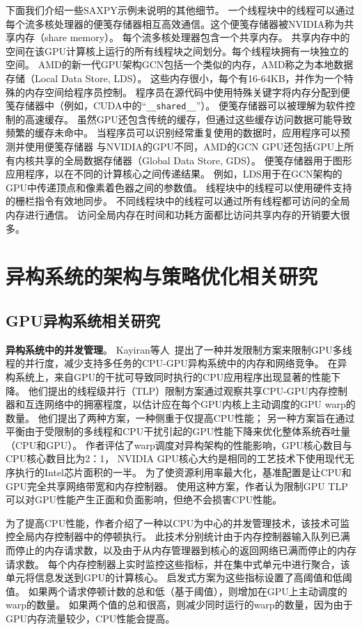 下面我们介绍一些SAXPY示例未说明的其他细节。
一个线程块中的线程可以通过每个流多核处理器的便笺存储器相互高效通信。这个便笺存储器被NVIDIA称为共享内存（share memory）。
每个流多核处理器包含一个共享内存。
共享内存中的空间在该GPU计算核上运行的所有线程块之间划分。每个线程块拥有一块独立的空间。
AMD的新一代GPU架构GCN包括一个类似的内存，AMD称之为本地数据存储（Local Data Store, LDS）。
这些内存很小，每个有16-64KB，并作为一个特殊的内存空间给程序员控制。
程序员在源代码中使用特殊关键字将内存分配到便笺存储器中（例如，CUDA中的``\texttt{\_\_shared\_\_}''）。
便笺存储器可以被理解为软件控制的高速缓存。
虽然GPU还包含传统的缓存，但通过这些缓存访问数据可能导致频繁的缓存未命中。
当程序员可以识别经常重复使用的数据时，应用程序可以预测并使用便笺存储器
与NVIDIA的GPU不同，AMD的GCN GPU还包括GPU上所有内核共享的全局数据存储器（Global Data Store, GDS）。
便笺存储器用于图形应用程序，以在不同的计算核心之间传递结果。
例如，LDS用于在GCN架构的GPU中传递顶点和像素着色器之间的参数值。
线程块中的线程可以使用硬件支持的栅栏指令有效地同步。 
不同线程块中的线程可以通过所有线程都可访问的全局内存进行通信。 
访问全局内存在时间和功耗方面都比访问共享内存的开销要大很多。

\section{异构系统的架构与策略优化相关研究}

\subsection{GPU异构系统相关研究}

\textbf{异构系统中的并发管理}。 
Kayiran等人~提出了一种并发限制方案来限制GPU多线程的并行度，减少支持多任务的CPU-GPU异构系统中的内存和网络竞争。
在异构系统上，来自GPU的干扰可导致同时执行的CPU应用程序出现显著的性能下降。
他们提出的线程级并行（TLP）限制方案通过观察共享CPU-GPU内存控制器和互连网络中的拥塞程度，以估计应在每个GPU内核上主动调度的GPU warp的数量。
他们提出了两种方案，一种侧重于仅提高CPU性能；
另一种方案旨在通过平衡由于受限制的多线程和CPU干扰引起的GPU性能下降来优化整体系统吞吐量（CPU和GPU）。
作者评估了warp调度对异构架构的性能影响，GPU核心数目与CPU核心数目比为2：1，
NVIDIA GPU核心大约是相同的工艺技术下使用现代无序执行的Intel芯片面积的一半。
为了使资源利用率最大化，基准配置是让CPU和GPU完全共享网络带宽和内存控制器。
使用这种方案，作者认为限制GPU TLP可以对GPU性能产生正面和负面影响，但绝不会损害CPU性能。

为了提高CPU性能，作者介绍了一种以CPU为中心的并发管理技术，该技术可监控全局内存控制器中的停顿执行。
此技术分别统计由于内存控制器输入队列已满而停止的内存请求数，以及由于从内存管理器到核心的返回网络已满而停止的内存请求数。 
每个内存控制器上实时监控这些指标，并在集中式单元中进行聚合，该单元将信息发送到GPU的计算核心。
启发式方案为这些指标设置了高阈值和低阈值。 
如果两个请求停顿计数的总和低（基于阈值），则增加在GPU上主动调度的warp的数量。 
如果两个值的总和很高，则减少同时运行的warp的数量，因为由于GPU内存流量较少，CPU性能会提高。

